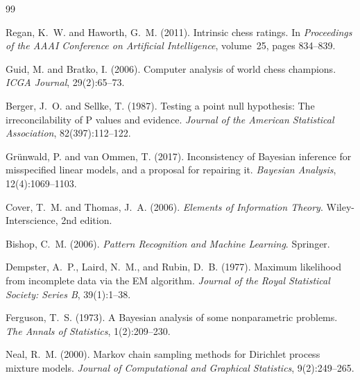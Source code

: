 \documentclass[11pt,a4paper]{article}
\begin{document}


\begin{thebibliography}{99}

Regan, K.~W. and Haworth, G.~M. (2011).
\newblock Intrinsic chess ratings.
\newblock In \emph{Proceedings of the AAAI Conference on Artificial
Intelligence}, volume~25, pages 834--839.

Guid, M. and Bratko, I. (2006).
\newblock Computer analysis of world chess champions.
\newblock \emph{ICGA Journal}, 29(2):65--73.

Berger, J.~O. and Sellke, T. (1987).
\newblock Testing a point null hypothesis: The irreconcilability of {P} values
and evidence.
\newblock \emph{Journal of the American Statistical Association},
82(397):112--122.

Gr{\"u}nwald, P. and van Ommen, T. (2017).
\newblock Inconsistency of {B}ayesian inference for misspecified linear models,
and a proposal for repairing it.
\newblock \emph{Bayesian Analysis}, 12(4):1069--1103.

Cover, T.~M. and Thomas, J.~A. (2006).
\newblock \emph{Elements of Information Theory}.
\newblock Wiley-Interscience, 2nd edition.

Bishop, C.~M. (2006).
\newblock \emph{Pattern Recognition and Machine Learning}.
\newblock Springer.

Dempster, A.~P., Laird, N.~M., and Rubin, D.~B. (1977).
\newblock Maximum likelihood from incomplete data via the {EM} algorithm.
\newblock \emph{Journal of the Royal Statistical Society: Series B},
39(1):1--38.

Ferguson, T.~S. (1973).
\newblock A {B}ayesian analysis of some nonparametric problems.
\newblock \emph{The Annals of Statistics}, 1(2):209--230.

Neal, R.~M. (2000).
\newblock Markov chain sampling methods for {D}irichlet process mixture models.
\newblock \emph{Journal of Computational and Graphical Statistics},
9(2):249--265.


\end{thebibliography}
\end{document}
